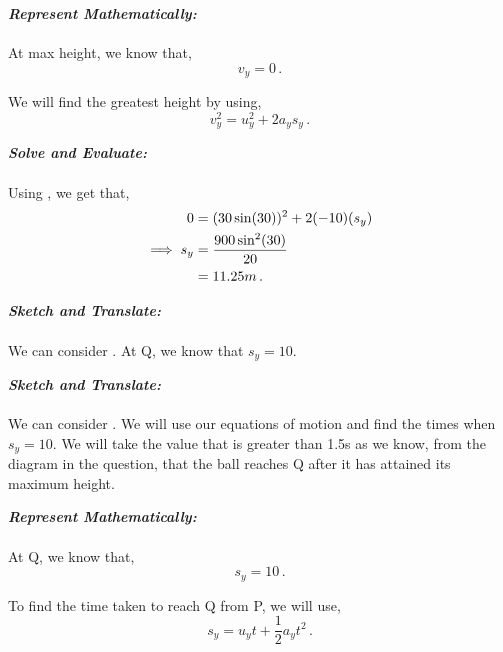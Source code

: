 \begin{subquestions}
\textbf{\textit{Represent Mathematically:}} \\ \\
At max height, we know that,
\begin{equation}
	v_y = 0 \,.
\end{equation}

We will find the greatest height by using,
\begin{equation}
	v_y^2 = u_y^2 + 2a_ys_y \label{2005:q5:SEqn1} \,.
\end{equation}




\textbf{\textit{Solve and Evaluate:}} \\ \\
Using , we get that,
\begin{align}
	0 & = (30\sin(30))^2 + 2(-10)(s_y) \nonumber \\
	\implies s_y & = \frac{900\sin^2(30)}{20} \nonumber \\
	             & = 11.25m \,.	
\end{align}


\subquestion 

\textbf{\textit{Sketch and Translate:}} \\ \\
We can consider . At Q, we know that $s_y=10$.




\textbf{\textit{Sketch and Translate:}} \\ \\
We can consider . We will use our equations of motion and find the times when $s_y=10$. We will take the value that is greater than 1.5s as we know, from the diagram in the question, that the ball reaches Q after it has attained its maximum height.




\textbf{\textit{Represent Mathematically:}} \\ \\
At Q, we know that,
\begin{equation}
	s_y=10 \,.
\end{equation}

To find the time taken to reach Q from P, we will use,
\begin{equation}
	s_y = u_yt + \frac{1}{2}a_yt^2 \label{2005:q6:SEqn2} \,.
\end{equation}





\end{subquestions}
